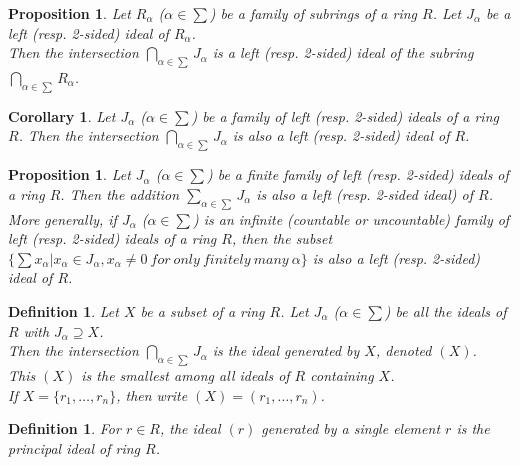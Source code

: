 \documentclass[a4paper,sfsidenotes,openany]{tufte-book}
\theoremstyle{theorem}
\newtheorem{corollary}[theorem]{Corollary}
\newtheorem{proposition}[theorem]{Proposition}
\newtheorem{definition}[theorem]{Definition}
\begin{document}
\begin{fullwidth}
\begin{proposition}
Let $R_\alpha$ ($\alpha \in \sum$) be a family of subrings of a ring $R$. Let $J_\alpha$ be a left (resp. 2-sided) ideal of $R_\alpha$.\\
Then the intersection $\bigcap\limits_{\alpha \in \sum}J_\alpha$ is a left (resp. 2-sided) ideal of the subring $\bigcap\limits_{\alpha \in \sum}R_\alpha$.\\
\end{proposition}
\>

\begin{corollary}
Let $J_\alpha$ ($\alpha \in \sum$) be a family of left (resp. 2-sided) ideals of a ring $R$. Then the intersection $\bigcap\limits_{\alpha \in \sum}J_\alpha$ is also a left (resp. 2-sided) ideal of $R$.\\
\end{corollary}
\>

\begin{proposition}
Let $J_\alpha$ ($\alpha \in \sum$) be a finite family of left (resp. 2-sided) ideals of a ring $R$. Then the addition $\sum_{\alpha \in \sum} J_\alpha$ is also a left (resp. 2-sided ideal) of $R$.\\
More generally, if $J_\alpha$ ($\alpha \in \sum$) is an infinite (countable or uncountable) family of left (resp. 2-sided) ideals of a ring $R$, then the subset $\{\sum x_\alpha | x_\alpha \in J_\alpha, x_\alpha \neq 0 \ for \ only \ finitely \ many \ \alpha\}$ is also a left (resp. 2-sided) ideal of $R$.\\
\end{proposition}
\>

\begin{definition}
Let $X$ be a subset of a ring $R$. Let $J_\alpha$ ($\alpha \in \sum$) be all the ideals of $R$ with $J_\alpha \supseteq X$.\\
Then the intersection $\bigcap\limits_{\alpha \in \sum}J_\alpha$ is the \textit{{\color{blue} ideal generated by $X$}}, denoted $(X)$.\\
This $(X)$ is the smallest among all ideals of $R$ containing $X$.\\
If $X=\{r_1, \ldots, r_n\}$, then write $(X)=(r_1, \ldots, r_n)$.\\
\end{definition}
\>

\begin{definition}
For $r \in R$, the ideal $(r)$ generated by a single element $r$ is the \textit{{\color{blue} principal ideal of ring $R$}}.\\
\end{definition}
\>


\end{fullwidth}
\end{document}
